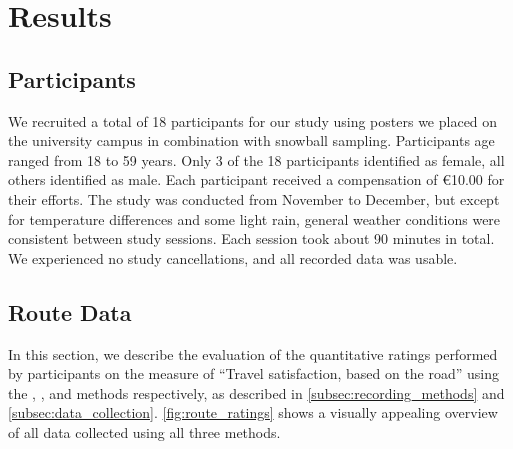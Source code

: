 \section{Results}\label{sec:results}

\subsection{Participants}

We recruited a total of 18 participants for our study using posters we placed on the university campus in combination with snowball sampling.
Participants age ranged from 18 to 59 years.
Only 3 of the 18 participants identified as female, all others identified as male.
Each participant received a compensation of \euro10.00 for their efforts.
The study was conducted from November to December, but except for temperature differences and some light rain, general weather conditions were consistent between study sessions.
Each session took about 90 minutes in total.
We experienced no study cancellations, and all recorded data was usable.

\subsection{Route Data}

In this section, we describe the evaluation of the quantitative ratings performed by participants on the measure of “Travel satisfaction, based on the road” using the \likertshift, \audiorecording, and \mapping methods respectively, as described in \autoref{subsec:recording_methods} and \autoref{subsec:data_collection}. \autoref{fig:route_ratings} shows a visually appealing overview of all data collected using all three methods.

